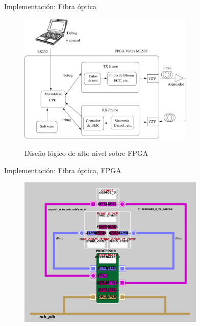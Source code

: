 \documentclass[aspectratio=169]{beamer}
\begin{document}
\begin{frame}{Implementación: Fibra óptica}

\begin{figure}[t]
  \centering
    \includegraphics[width=3.3in]{../graphs/fpgadesign.pdf}
     
     Diseño lógico de alto nivel sobre FPGA
\label{fig:fpgadesign}
\end{figure}

\end{frame}

\begin{frame}{Implementación: Fibra óptica, FPGA}

\begin{figure}[t]
  \centering
    \includegraphics[width=3.5in]{../graphs/diagramaXilinx.png}
\label{fig:fpgahard}
\end{figure}

\end{frame}
\end{document}
